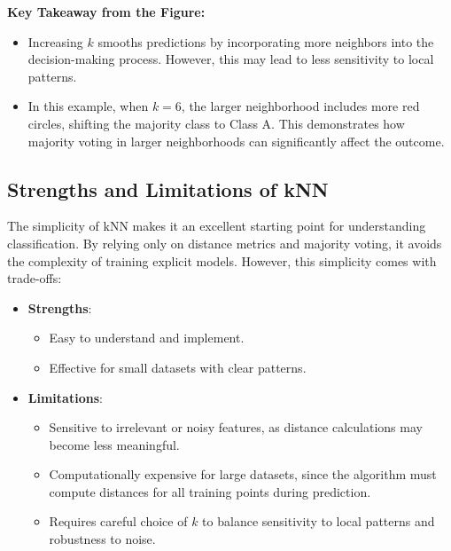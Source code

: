 \documentclass[
]{book}
\providecommand{\tightlist}{%
  \setlength{\itemsep}{0pt}\setlength{\parskip}{0pt}}
\theoremstyle{definition}
\theoremstyle{definition}
\theoremstyle{definition}
\theoremstyle{definition}
\theoremstyle{remark}
\begin{document}
\textbf{Key Takeaway from the Figure:}

\begin{itemize}
\tightlist
\item
  Increasing \(k\) smooths predictions by incorporating more neighbors into the decision-making process. However, this may lead to less sensitivity to local patterns.\\
\item
  In this example, when \(k = 6\), the larger neighborhood includes more red circles, shifting the majority class to Class A. This demonstrates how majority voting in larger neighborhoods can significantly affect the outcome.
\end{itemize}

\subsection*{Strengths and Limitations of kNN}\label{strengths-and-limitations-of-knn}

The simplicity of kNN makes it an excellent starting point for understanding classification. By relying only on distance metrics and majority voting, it avoids the complexity of training explicit models. However, this simplicity comes with trade-offs:

\begin{itemize}
\tightlist
\item
  \textbf{Strengths}:

  \begin{itemize}
  \tightlist
  \item
    Easy to understand and implement.\\
  \item
    Effective for small datasets with clear patterns.
  \end{itemize}
\item
  \textbf{Limitations}:

  \begin{itemize}
  \tightlist
  \item
    Sensitive to irrelevant or noisy features, as distance calculations may become less meaningful.\\
  \item
    Computationally expensive for large datasets, since the algorithm must compute distances for all training points during prediction.\\
  \item
    Requires careful choice of \(k\) to balance sensitivity to local patterns and robustness to noise.
  \end{itemize}
\end{itemize}
\end{document}
